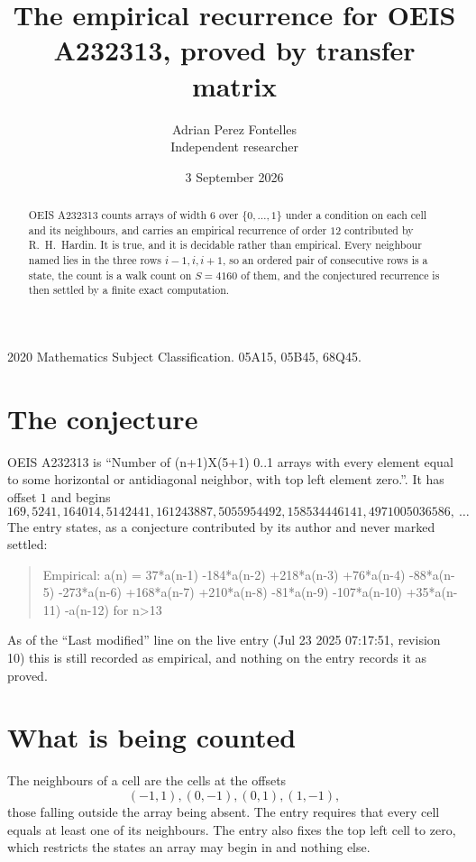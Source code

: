\documentclass[11pt,a4paper]{article}
\title{The empirical recurrence for OEIS A232313, proved by transfer matrix}
\author{Adrian Perez Fontelles\\ \small Independent researcher}
\date{3 September 2026}
\theoremstyle{plain}
\theoremstyle{definition}
\begin{document}
\maketitle

\begin{abstract}
OEIS A232313 counts arrays of width $6$ over $\{0,\dots,1\}$ under a condition on each cell
and its neighbours, and carries an empirical recurrence of order $12$ contributed by
R.~H.~Hardin. It is true, and it is decidable rather than empirical. Every neighbour named lies
in the three rows $i-1,i,i+1$, so an ordered pair of consecutive rows is a state, the count is
a walk count on $S=4160$ of them, and the conjectured recurrence is then settled by a finite
exact computation.
\end{abstract}

\noindent\small 2020 Mathematics Subject Classification. 05A15, 05B45, 68Q45.\normalsize

\section{The conjecture}

OEIS A232313 is ``Number of (n+1)X(5+1) 0..1 arrays with every element equal to some horizontal or antidiagonal neighbor, with top left element zero.''. It has offset $1$ and begins
\[
169, 5241, 164014, 5142441, 161243887, 5055954492, 158534446141, 4971005036586,\ \dots
\]
The entry states, as a conjecture contributed by its author and never marked settled:
\begin{quote}
Empirical: a(n) = 37*a(n-1) -184*a(n-2) +218*a(n-3) +76*a(n-4) -88*a(n-5) -273*a(n-6) +168*a(n-7) +210*a(n-8) -81*a(n-9) -107*a(n-10) +35*a(n-11) -a(n-12) for n>13
\end{quote}
As of the ``Last modified'' line on the live entry (Jul 23 2025 07:17:51, revision 10) this is still
recorded as empirical, and nothing on the entry records it as proved.

\section{What is being counted}

The neighbours of a cell are the cells at the offsets
\[
(-1,1), (0,-1), (0,1), (1,-1),
\]
those falling outside the array being absent. The entry requires that every cell equals at least one of its neighbours. The entry also fixes the top left cell to zero, which restricts the states an array may begin in and nothing else.
\end{document}
